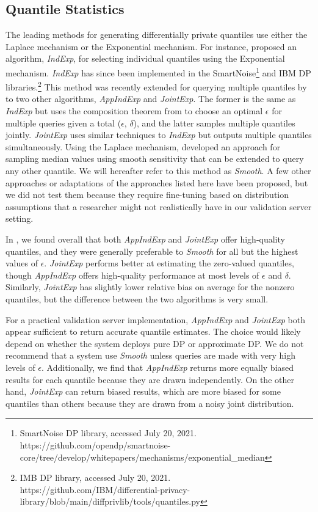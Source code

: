 \subsection{Quantile Statistics}
The leading methods for generating differentially private quantiles use either the Laplace mechanism or the Exponential mechanism. For instance, \citet{smith2011privacy} proposed an algorithm, \textit{IndExp}, for selecting individual quantiles using the Exponential mechanism. \textit{IndExp} has since been implemented in the SmartNoise\footnote{SmartNoise DP library, accessed July 20, 2021. https://github.com/opendp/smartnoise-core/tree/develop/whitepapers/mechanisms/exponential\_median} and IBM DP libraries.\footnote{IMB DP library, accessed July 20, 2021. https://github.com/IBM/differential-privacy-library/blob/main/diffprivlib/tools/quantiles.py} This method was recently extended for querying multiple quantiles by \citet{gillenwater2021differentially} to two other algorithms, \textit{AppIndExp} and \textit{JointExp}. The former is the same as \textit{IndExp} but uses the composition theorem from \citet{dong2020optimal} to choose an optimal $\epsilon$ for multiple queries given a total ($\epsilon$, $\delta$), and the latter samples multiple quantiles jointly. \textit{JointExp} uses similar techniques to \textit{IndExp} but outputs multiple quantiles simultaneously. Using the Laplace mechanism, \citet{nissim2007smooth} developed an approach for sampling median values using smooth sensitivity that can be extended to query any other quantile. We will hereafter refer to this method as \textit{Smooth}. A few other approaches or adaptations of the approaches listed here have been proposed, but we did not test them because they require fine-tuning based on distribution assumptions that a researcher might not realistically have in our validation server setting.

In \citet{barrientos2021}, we found overall that both \textit{AppIndExp} and \textit{JointExp} offer high-quality quantiles, and they were generally preferable to \textit{Smooth} for all but the highest values of $\epsilon$. \textit{JointExp} performs better at estimating the zero-valued quantiles, though \textit{AppIndExp} offers high-quality performance at most levels of $\epsilon$ and $\delta$. Similarly, \textit{JointExp} has slightly lower relative bias on average for the nonzero quantiles, but the difference between the two algorithms is very small. 

For a practical validation server implementation, \textit{AppIndExp} and \textit{JointExp} both appear sufficient to return accurate quantile estimates. The choice would likely depend on whether the system deploys pure DP or approximate DP. We do not recommend that a system use \textit{Smooth} unless queries are made with very high levels of $\epsilon$. Additionally, we find that \textit{AppIndExp} returns more equally biased results for each quantile because they are drawn independently. On the other hand, \textit{JointExp} can return biased results, which are more biased for some quantiles than others because they are drawn from a noisy joint distribution.

